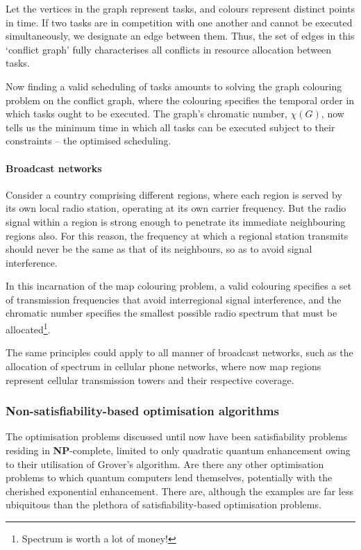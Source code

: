 Let the vertices in the graph represent tasks, and colours represent distinct points in time. If two tasks are in competition with one another and cannot be executed simultaneously, we designate an edge between them. Thus, the set of edges in this `conflict graph' fully characterises all conflicts in resource allocation between tasks.

Now finding a valid scheduling of tasks amounts to solving the graph colouring problem on the conflict graph, where the colouring specifies the temporal order in which tasks ought to be executed. The graph's chromatic number, $\chi(G)$, now tells us the minimum time in which all tasks can be executed subject to their constraints -- the optimised scheduling.

\paragraph{Broadcast networks}

Consider a country comprising different regions, where each region is served by its own local radio station, operating at its own carrier frequency. But the radio signal within a region is strong enough to penetrate its immediate neighbouring regions also. For this reason, the frequency at which a regional station transmits should never be the same as that of its neighbours, so as to avoid signal interference.

In this incarnation of the map colouring problem, a valid colouring specifies a set of transmission frequencies that avoid interregional signal interference, and the chromatic number specifies the smallest possible radio spectrum that must be allocated\footnote{Spectrum is worth a lot of money!}.

The same principles could apply to all manner of broadcast networks, such as the allocation of spectrum in cellular phone networks, where now map regions represent cellular transmission towers and their respective coverage.

\subsubsection{Non-satisfiability-based optimisation algorithms}

The optimisation problems discussed until now have been satisfiability problems residing in \textbf{NP}-complete, limited to only quadratic quantum enhancement owing to their utilisation of Grover's algorithm. Are there any other optimisation problems to which quantum computers lend themselves, potentially with the cherished exponential enhancement. There are, although the examples are far less ubiquitous than the plethora of satisfiability-based optimisation problems.

